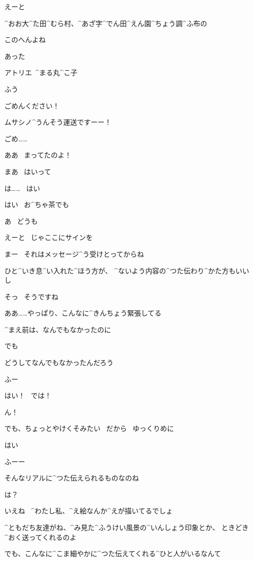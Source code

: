 \Kokone えーと

\Kokone ^{おお}{大}^{た}{田}^{むら}{村}、^{あざ}{字}^{でん}{田}^{えん}{園}^{ちょう}{調}^{ふ}{布}の

\Kokone このへんよね

\page
\Kokone あった

\Sign アトリエ\ ^{まる}{丸}^{こ}{子}

\Kokone ふう

\page
\Kokone ごめんください！

\Kokone ムサシノ^{うんそう}{運送}ですーー！

\Kokone ごめ……

\Maruko ああ
\ まってたのよ！

\Maruko まあ
\ はいって

\Kokone は……
\ はい

\page
\Maruko はい
\ お^{ちゃ}{茶}でも

\Kokone あ
\ どうも

\Kokone えーと
\ じゃここにサインを

\Maruko まー
\ それはメッセージ^{う}{受}けとってからね

\Maruko ひと^{いき}{息}^{い}{入}れた^{ほう}{方}が、
^{ないよう}{内容}の^{つた}{伝}わり^{かた}{方}もいいし

\Kokone そっ
\ そうですね

\page
\Kokone ああ……やっぱり、こんなに^{きんちょう}{緊張}してる

\Kokone ^{まえ}{前}は、なんでもなかったのに

\Kokone でも

\Kokone どうしてなんでもなかったんだろう

\Kokone ふー

\page
\Kokone はい！
\ では！

\Maruko ん！

\Maruko でも、ちょっとやけくそみたい
\ だから
\ ゆっくりめに

\Kokone はい

\page
\Maruko ふーー

\Maruko そんなリアルに^{つた}{伝}えられるものなのね

\Kokone は？

\Maruko いえね
\ ^{わたし}{私}、^{え}{絵}なんか^{えが}{描}いてるでしょ

\Maruko ^{ともだち}{友達}がね、^{み}{見}た^{ふうけい}{風景}の^{いんしょう}{印象}とか、
ときどき^{おく}{送}ってくれるのよ

\page
\Maruko でも、こんなに^{こま}{細}やかに^{つた}{伝}えてくれる^{ひと}{人}がいるなんて

